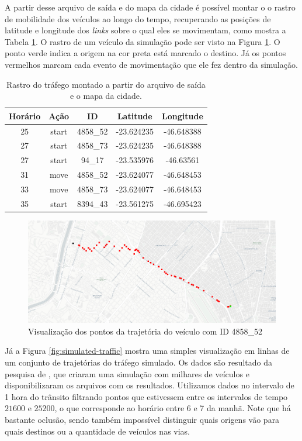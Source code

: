 {  A partir desse arquivo de saída e do mapa da cidade é possível montar o o
rastro de mobilidade dos veículos ao longo do tempo, recuperando as posições de
latitude e longitude dos \emph{links} sobre o qual eles se movimentam, como
mostra a Tabela \ref{table:rastro}. O rastro de um veículo da simulação pode
ser visto na Figura \ref{fig:rastro}. O ponto verde indica a origem na cor
preta está marcado o destino. Já os pontos vermelhos marcam cada evento de
movimentação que ele fez dentro da simulação.

\begin{table}[!htb]
\centering
\begin{tabular}{|c|c|c|c|c|}
\hline
\textbf{Horário} & \textbf{Ação} & \textbf{ID} & \textbf{Latitude} & \textbf{Longitude} \\
\hline
25 & start & 4858\_52 & -23.624235 & -46.648388 \\
27 & start & 4858\_73 & -23.624235 & -46.648388 \\
27 & start & 94\_17 & -23.535976 & -46.63561    \\
31 & move & 4858\_52 & -23.624077 & -46.648453 \\
33 & move & 4858\_73 & -23.624077 & -46.648453 \\
35 & start & 8394\_43 & -23.561275 & -46.695423 \\
\hline
\end{tabular}
\caption[Rastro do tráfego] {Rastro do tráfego montado a partir do arquivo de saída e o mapa da cidade. \label{table:rastro}}
\end{table}

\begin{figure}[!htb]
  \centering
  \includegraphics[width=\textwidth]{../figuras/pontos.png}
  \caption[Visualização dos pontos da trajetória de um veículo]{Visualização dos pontos da trajetória do veículo com ID 4858\_52 \label{fig:rastro}}
\end{figure}

Já a Figura \ref{fig:simulated-traffic} mostra uma simples visualização em linhas
de um conjunto de trajetórias do tráfego simulado. Os dados são resultado
da pesquisa de \citet{santana2018courb}, que criaram uma simulação com milhares
de veículos e disponibilizaram os arquivos com os resultados. Utilizamos dados
no intervalo de 1 hora do trânsito filtrando pontos que estivessem entre os
intervalos de tempo $21600$ e $25200$, o que corresponde ao horário entre 6 e 7
da manhã. Note que há bastante oclusão, sendo também impossível distinguir
quais origens vão para quais destinos ou a quantidade de veículos nas vias.

}
